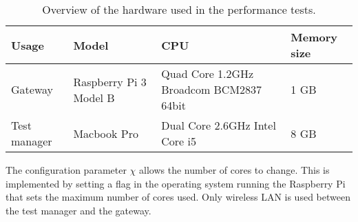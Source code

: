 \begin{table}[h!]
    \caption{Overview of the hardware used in the performance tests.}
    \label{tab:test_environment_hardware}

    \begin{center}
        \begin{tabular}{|l|l|p{4cm}|l|}
            \hline
            Usage           & Model                     & CPU  & Memory size \\
            \hline
            Gateway         & Raspberry Pi 3 Model B    & Quad Core 1.2GHz Broadcom
            BCM2837 64bit  & 1 GB \\

            Test manager    & Macbook Pro               & Dual Core 2.6GHz
            Intel Core i5    & 8 GB \\
            \hline
        \end{tabular}
    \end{center}
\end{table}

The configuration parameter $\chi$ allows the number of cores to change. This
is implemented by setting a flag in the operating system running the Raspberry
Pi that sets the maximum number of cores used. Only wireless LAN is used
between the test manager and the gateway.

